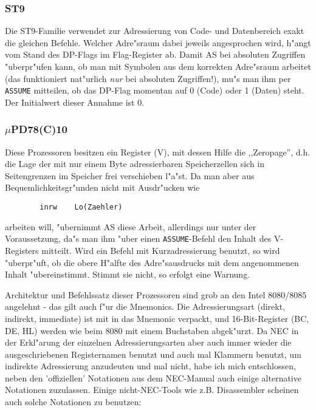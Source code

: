 \documentclass[12pt,a4paper,twoside]{report}
\newcommand{\tty}[1]{{\tt #1}}
\begin{document}

\subsubsection{ST9}

Die ST9-Familie verwendet zur Adressierung von Code- und Datenbereich
exakt die gleichen Befehle.  Welcher Adre"sraum dabei jeweils
angesprochen wird, h"angt vom Stand des DP-Flags im Flag-Register ab.
Damit AS bei absoluten Zugriffen "uberpr"ufen kann, ob man mit Symbolen
aus dem korrekten Adre"sraum arbeitet (das funktioniert nat"urlich {\em nur}
bei absoluten Zugriffen!), mu"s man ihm per \tty{ASSUME} mitteilen, ob das
DP-Flag momentan auf 0 (Code) oder 1 (Daten) steht.  Der Initialwert
dieser Annahme ist 0.


\subsubsection{$\mu$PD78(C)10}

Diese Prozessoren besitzen ein Register (V), mit dessen Hilfe die
,,Zeropage'', d.h. die Lage der mit nur einem Byte adressierbaren
Speicherzellen sich in Seitengrenzen im Speicher frei verschieben l"a"st.
Da man aber aus Bequemlichkeitsgr"unden nicht mit Ausdr"ucken wie
\begin{verbatim}
        inrw    Lo(Zaehler)
\end{verbatim}
arbeiten will, "ubernimmt AS diese Arbeit, allerdings nur unter der
Voraussetzung, da"s man ihm "uber einen \tty{ASSUME}-Befehl den
Inhalt des V-Registers mitteilt.  Wird ein Befehl mit Kurzadressierung
benutzt, so wird "uberpr"uft, ob die obere H"alfte des Adre"sausdrucks
mit dem angenommenen Inhalt "ubereinstimmt.  Stimmt sie nicht, so erfolgt
eine Warnung.

Architektur und Befehlssatz dieser Prozessoren sind grob an den
Intel 8080/8085 angelehnt - das gilt auch f"ur die Mnemonics.  Die
Adressierungsart (direkt, indirekt, immediate) ist mit in das
Mnemonic verpackt, und 16-Bit-Register (BC, DE, HL) werden wie
beim 8080 mit einem Buchstaben abgek"urzt.  Da NEC in der
Erkl"arung der einzelnen Adressierungsarten aber auch immer
wieder die ausgeschriebenen Registernamen benutzt und auch mal
Klammern benutzt, um indirekte Adressierung anzudeuten und mal
nicht, habe ich mich entschlossen, neben den 'offiziellen'
Notationen aus dem NEC-Manual auch einige alternative Notationen
zuzulassen.  Einige nicht-NEC-Tools wie z.B. Disassembler
scheinen auch solche Notationen zu benutzen:
\end{document}
